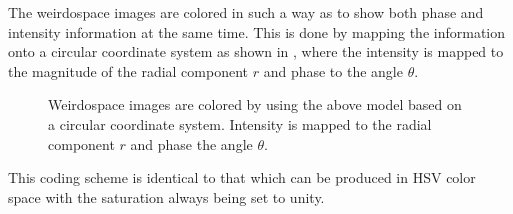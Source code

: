 The weirdospace images are colored in such a way as to show both phase and
intensity information at the same time.  This is done by mapping the
information onto a circular coordinate system as shown in , where the intensity is mapped to the magnitude of the radial
component $r$ and phase to the angle $\theta$.
\begin{figure}[ht]
\centering
\caption{Weirdospace images are colored by using the above model based on a
circular coordinate system.  Intensity is mapped to the radial component
$r$ and phase the angle $\theta$.}
\label{fig:hsv}
\end{figure}
This coding scheme is identical to that which can be produced in HSV color
space with the saturation always being set to unity.


